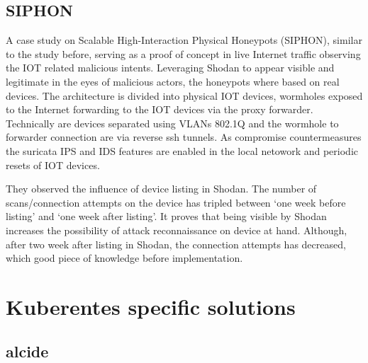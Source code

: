 \subsection{SIPHON \label{related:active-anal:siphon}}
A case study \cite{study:siphon} on Scalable High-Interaction Physical Honeypots (SIPHON), similar to the study before, serving as a proof of concept in live Internet traffic observing the IOT related malicious intents. Leveraging Shodan to appear visible and legitimate in the eyes of malicious actors, the honeypots where based on real devices. The architecture is divided into physical IOT devices, wormholes exposed to the Internet forwarding to the IOT devices via the proxy forwarder. Technically are devices separated using VLANs 802.1Q and the wormhole to forwarder connection are via reverse ssh tunnels. As compromise countermeasures the suricata IPS and IDS features are enabled in the local netowork and periodic resets of IOT devices.

They observed the influence of device listing in Shodan. The number of scans/connection attempts on the device has tripled between `one week before listing' and `one week after listing'. It proves that being visible by Shodan increases the possibility of attack reconnaissance on device at hand. Although, after two week after listing in Shodan, the connection attempts has decreased, which good piece of knowledge before implementation.

\section{Kuberentes specific solutions \label{related:k8s}}

\subsection{alcide \label{related:k8s:alcide}}
